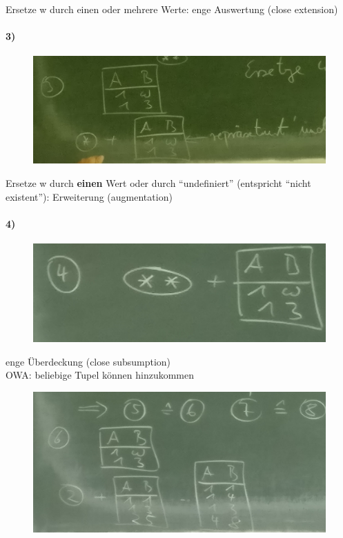 \documentclass[12pt, a4paper]{article}
\begin{document}
Ersetze w durch einen oder mehrere Werte: enge Auswertung (close extension)


\paragraph{3)}
\begin{figure}
\centering
\includegraphics[width=0.7\linewidth]{img/img35}
\caption{}
\label{fig:img35}
\end{figure}

Ersetze w durch \textbf{einen} Wert oder durch ``undefiniert'' (entspricht ``nicht existent''): Erweiterung (augmentation)

\paragraph{4)}
\begin{figure}
\centering
\includegraphics[width=0.7\linewidth]{img/img36}
\caption{}
\label{fig:img36}
\end{figure}

enge Überdeckung (close subsumption) \\

OWA: beliebige Tupel können hinzukommen

\begin{figure}
\centering
\includegraphics[width=0.7\linewidth]{img/img37}
\caption{}
\label{fig:img37}
\end{figure}
\end{document}
